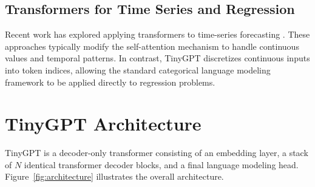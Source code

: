 \documentclass[conference]{IEEEtran}
\begin{document}
\subsection{Transformers for Time Series and Regression}

Recent work has explored applying transformers to time-series forecasting \cite{wu2020autoformer, zhou2021informer, liu2022itransformer}. These approaches typically modify the self-attention mechanism to handle continuous values and temporal patterns. In contrast, TinyGPT discretizes continuous inputs into token indices, allowing the standard categorical language modeling framework to be applied directly to regression problems.

\section{TinyGPT Architecture}
\label{sec:architecture}

TinyGPT is a decoder-only transformer consisting of an embedding layer, a stack of $N$ identical transformer decoder blocks, and a final language modeling head. Figure~\ref{fig:architecture} illustrates the overall architecture.
\end{document}
